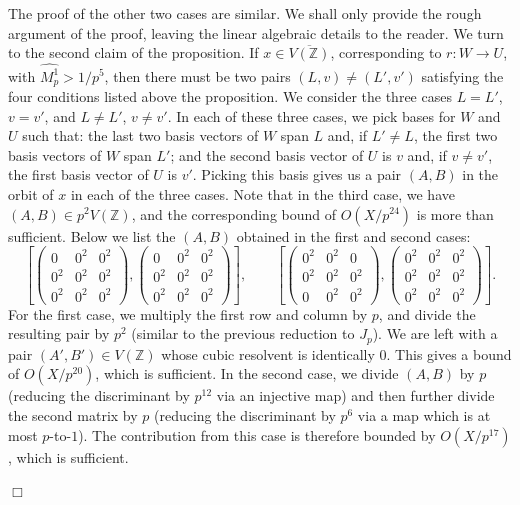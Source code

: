 \documentclass{article}
\def\Z{{\mathbb Z}}
\def\Z{{\mathbb Z}}
\def\ol{\overline}
\newenvironment{proof}{\noindent {\bf Proof:}}{$\Box$ \vspace{2 ex}}
\begin{document}
\begin{proof}
The proof of the other two cases are similar. We shall only provide the rough argument of the proof, leaving the linear algebraic details to the reader. We turn to the second claim of the proposition. If $x\in\ol{V(\Z)}$, corresponding to $r:W\to U$, with $\widehat{M_p^1}>1/p^5$, then there must be two pairs $(L,v)\neq (L',v')$ satisfying the four conditions listed above the proposition. We consider the three cases $L=L'$, $v=v'$, and $L\neq L'$, $v\neq v'$. In each of these three cases, we pick bases for $W$ and $U$ such that: the last two basis vectors of $W$ span $L$ and, if $L'\neq L$, the first two basis vectors of $W$ span $L'$; and the second basis vector of $U$ is $v$ and, if $v\neq v'$, the first basis vector of $U$ is $v'$. Picking this basis gives us a pair $(A,B)$ in the orbit of $x$ in each of the three cases. Note that in the third case, we have $(A,B)\in p^2V(\Z)$, and the corresponding bound of $O(X/p^{24})$ is more than sufficient. Below we list the $(A,B)$ obtained in the first and second cases:
\begin{equation*}
\left[\begin{pmatrix} {0}&0^2&0^2\\0^2&{0^2}&{0^2}\\0^2&{0^2}&{0^2}\end{pmatrix},
\begin{pmatrix} {0}&0^2&0^2\\0^2&{0^2}&{0^2}\\0^2&{0^2}&{0^2}\end{pmatrix}\right],\quad\quad
\left[\begin{pmatrix}{0^2}&{0^2}&{0}\\{0^2}&{0^2}&{0^2}\\{0}&{0^2}&{0^2}\end{pmatrix},
\begin{pmatrix} {0^2}&0^2&0^2\\0^2&{0^2}&{0^2}\\0^2&{0^2}&{0^2}\end{pmatrix}\right].
\end{equation*}
For the first case, we multiply the first row and column by $p$, and divide the resulting pair by $p^2$ (similar to the previous reduction to $J_p$). We are left with a pair $(A',B')\in V(\Z)$ whose cubic resolvent is identically $0$. This gives a bound of $O(X/p^{20})$, which is sufficient. In the second case, we divide $(A,B)$ by $p$ (reducing the discriminant by $p^{12}$ via an injective map) and then further divide the second matrix by $p$ (reducing the discriminant by $p^6$ via a map which is at most $p$-to-$1$). The contribution from this case is therefore bounded by $O(X/p^{17})$, which is sufficient.


\end{proof}
\end{document}
